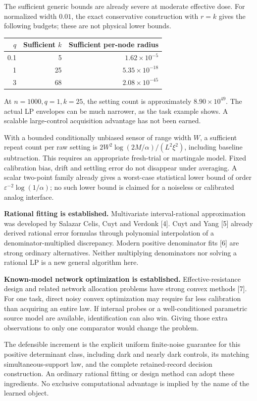 \documentclass[10pt,a4paper]{article}
\newcommand{\eps}{\varepsilon}
\begin{document}
The sufficient generic bounds are already severe at moderate effective dose.
For normalized width $0.01$, the exact conservative construction with $r=k$
gives the following budgets; these are not physical lower bounds.
\begin{center}
\begin{tabular}{rrr}
\toprule
$q$ & Sufficient $k$ & Sufficient per-node radius\\
\midrule
0.1 & 5 & $1.62\times10^{-5}$\\
1 & 25 & $5.35\times10^{-18}$\\
3 & 68 & $2.08\times10^{-45}$\\
\bottomrule
\end{tabular}
\end{center}
At $n=1000,q=1,k=25$, the setting count is approximately $8.90\times10^{49}$.
The actual LP envelopes can be much narrower, as the task example shows. A
scalable large-control acquisition advantage has not been earned.

With a bounded conditionally unbiased sensor of range width $W$, a sufficient
repeat count per raw setting is
$2W^2\log(2M/\alpha)/(L^2\xi^2)$, including baseline subtraction. This
requires an appropriate fresh-trial or martingale model. Fixed calibration
bias, drift and settling error do not disappear under averaging. A scalar
two-point family already gives a worst-case statistical lower bound of order
$\eps^{-2}\log(1/\alpha)$; no such lower bound is claimed for a noiseless
or calibrated analog interface.

\textbf{Rational fitting is established.} Multivariate interval-rational
approximation was developed by Salazar Celis, Cuyt and Verdonk [4]. Cuyt and
Yang [5] already derived rational error formulas through polynomial
interpolation of a denominator-multiplied discrepancy. Modern positive
denominator fits [6] are strong ordinary alternatives. Neither multiplying
denominators nor solving a rational LP is a new general algorithm here.

\textbf{Known-model network optimization is established.} Effective-resistance
design and related network allocation problems have strong convex methods [7].
For one task, direct noisy convex optimization may require far less calibration
than acquiring an entire law. If internal probes or a well-conditioned
parametric source model are available, identification can also win. Giving
those extra observations to only one comparator would change the problem.

The defensible increment is the explicit uniform finite-noise guarantee for
this positive determinant class, including dark and nearly dark controls,
its matching simultaneous-support law, and the complete retained-record
decision construction. An ordinary rational fitting or design method can adopt
these ingredients. No exclusive computational advantage is implied by the name
of the learned object.
\end{document}
